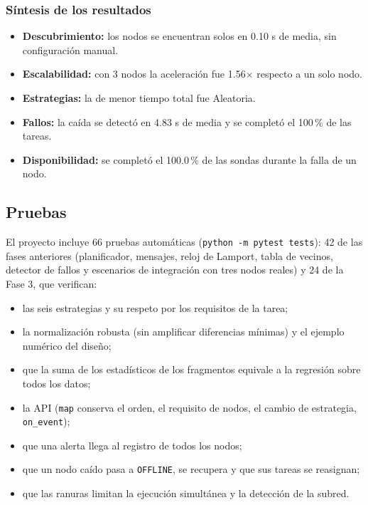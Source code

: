 \documentclass{article}
\begin{document}
\subsubsection{Síntesis de los resultados}

\begin{itemize}
\item \textbf{Descubrimiento:} los nodos se encuentran solos en 0.10 s de media, sin configuración manual.
\item \textbf{Escalabilidad:} con 3 nodos la aceleración fue 1.56$\times$ respecto a un solo nodo.
\item \textbf{Estrategias:} la de menor tiempo total fue Aleatoria.
\item \textbf{Fallos:} la caída se detectó en 4.83 s de media y se completó el 100\,\% de las tareas.
\item \textbf{Disponibilidad:} se completó el 100.0\,\% de las sondas durante la falla de un nodo.
\end{itemize}


\subsection{Pruebas}

El proyecto incluye 66 pruebas automáticas (\texttt{python -m pytest tests}): 42 de las fases anteriores
(planificador, mensajes, reloj de Lamport, tabla de vecinos, detector de fallos y escenarios de
integración con tres nodos reales) y 24 de la Fase 3, que verifican:

\begin{itemize}
\item las seis estrategias y su respeto por los requisitos de la tarea;
\item la normalización robusta (sin amplificar diferencias mínimas) y el ejemplo numérico del diseño;
\item que la suma de los estadísticos de los fragmentos equivale a la regresión sobre todos los datos;
\item la API (\texttt{map} conserva el orden, el requisito de nodos, el cambio de estrategia, \texttt{on\_event});
\item que una alerta llega al registro de todos los nodos;
\item que un nodo caído pasa a \texttt{OFFLINE}, se recupera y que sus tareas se reasignan;
\item que las ranuras limitan la ejecución simultánea y la detección de la subred.
\end{itemize}
\end{document}
